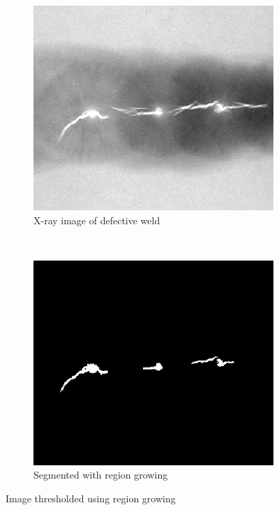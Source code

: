 \documentclass[]{article}
\begin{document}
\begin{figure}[H]
    \centering
    \begin{subfigure}{0.5\textwidth}
        \centering
        \includegraphics[width=\textwidth]{img/before/defective-weld}
        \caption{X-ray image of defective weld}
    \end{subfigure}%
    ~
    \begin{subfigure}{0.5\textwidth}
        \centering
        \includegraphics[width=\textwidth]{img/defective-weld-segmented}
        \caption{Segmented with region growing}
    \end{subfigure}%
    \caption{Image thresholded using region growing}
    \label{fig:region_growing}
\end{figure}
\end{document}
